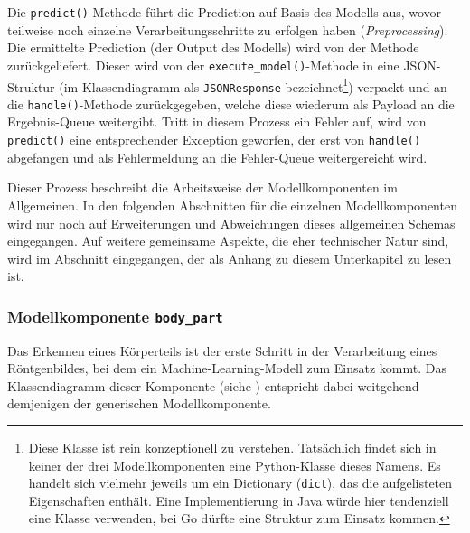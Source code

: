Die \texttt{predict()}-Methode führt die Prediction auf Basis des Modells aus, wovor teilweise noch einzelne Verarbeitungsschritte zu erfolgen haben (\textit{Preprocessing}). Die ermittelte Prediction (der Output des Modells) wird von der Methode zurückgeliefert. Dieser wird von der \texttt{execute\_model()}-Methode in eine JSON-Struktur (im Klassendiagramm als \texttt{JSONRe\-sponse} bezeichnet\footnote{Diese Klasse ist rein konzeptionell zu verstehen. Tatsächlich findet sich in keiner der drei Modellkomponenten eine Python-Klasse dieses Namens. Es handelt sich vielmehr jeweils um ein Dictionary (\texttt{dict}), das die aufgelisteten Eigenschaften enthält. Eine Implementierung in Java würde hier tendenziell eine Klasse verwenden, bei Go dürfte eine Struktur zum Einsatz kommen.}) verpackt und an die \texttt{handle()}-Methode zurückgegeben, welche diese wiederum als Payload an die Ergebnis-Queue weitergibt. Tritt in diesem Prozess ein Fehler auf, wird von \texttt{predict()} eine entsprechender Exception geworfen, der erst von \texttt{handle()} abgefangen und als Fehlermeldung an die Fehler-Queue weitergereicht wird.

Dieser Prozess beschreibt die Arbeitsweise der Modellkomponenten im Allgemeinen. In den folgenden Abschnitten für die einzelnen Modellkomponenten wird nur noch auf Erweiterungen und Abweichungen dieses allgemeinen Schemas eingegangen. Auf weitere gemeinsame Aspekte, die eher technischer Natur sind, wird im Abschnitt  eingegangen, der als Anhang zu diesem Unterkapitel zu lesen ist.

\subsubsection{Modellkomponente \texttt{body\_part}}
\label{sec:modellkomponente-body-part}

Das Erkennen eines Körperteils ist der erste Schritt in der Verarbeitung eines Röntgenbildes, bei dem ein Machine-Learning-Modell zum Einsatz kommt. Das Klassendiagramm dieser Komponente (siehe ) entspricht dabei weitgehend demjenigen der generischen Modellkomponente.

